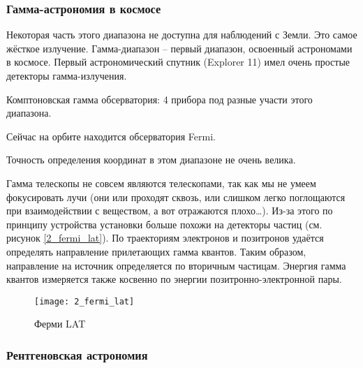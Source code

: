 \subsubsection{Гамма-астрономия в космосе}

Некоторая часть этого диапазона не доступна для наблюдений с Земли. Это самое жёсткое излучение. Гамма-диапазон – первый диапазон, освоенный астрономами в космосе. Первый астрономический спутник (Explorer 11) имел очень простые детекторы гамма-излучения.

Комптоновская гамма обсерватория: 4 прибора под разные участи этого диапазона. 

Сейчас на орбите находится обсерватория Fermi. 

Точность определения координат в этом диапазоне не очень велика.

Гамма телескопы  не совсем являются телескопами, так как мы не умеем фокусировать лучи (они или проходят сквозь, или слишком легко поглощаются при взаимодействии с веществом, а вот отражаются плохо…). Из-за этого по принципу устройства установки больше похожи на детекторы частиц (см. рисунок \ref{2_fermi_lat}). По траекториям электронов и позитронов удаётся определять направление прилетающих  гамма квантов. Таким образом, направление на источник определяется по вторичным частицам. Энергия гамма квантов измеряется также косвенно по энергии позитронно-электронной пары.

\begin{figure}[H]
	\centering
	\texttt{[image: 2\_fermi\_lat]}
	\caption{Ферми LAT}
	\label{fig:2_fermi_lat}
\end{figure}

\subsubsection{Рентгеновская астрономия}

